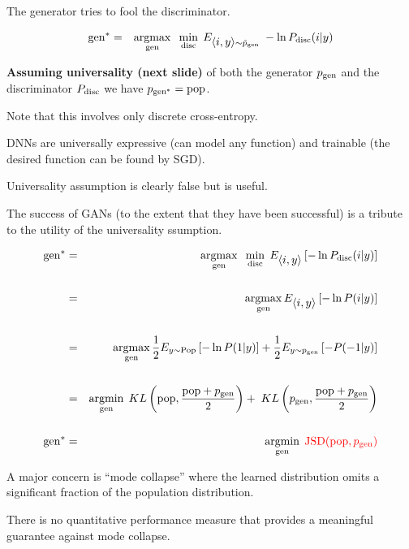 {

The generator tries to fool the discriminator.

\vfill
\begin{eqnarray*}
\mathrm{gen}^* & = & \operatorname*{argmax}_{\mathrm{gen}}\;\;\min_{\mathrm{disc}}\;E_{{\mbox{$\langle i,y\rangle$}} \sim \tilde{p}_{\mathrm{gen}}}\;-\ln P_{\mathrm{disc}}(i|y)
\end{eqnarray*}

\vfill
{\bf Assuming universality (next slide)} of both the generator $p_{\mathrm{gen}}$ and the discriminator $P_{\mathrm{disc}}$ we have {\color{red} $p_{\mathrm{gen}^*} = \mathrm{pop}$}.

\vfill
Note that this involves only discrete cross-entropy.



DNNs are universally expressive (can model any function) and trainable (the desired function can be found by SGD).

\vfill
Universality assumption is clearly false but is useful.

\vfill
The success of GANs (to the extent that they have been successful) is a tribute to the utility of the universality ssumption.



{\huge
\begin{eqnarray*}
  \mathrm{gen}^* & = & \operatorname*{argmax}_{\mathrm{gen}}\;\;\min_{\mathrm{disc}}\;E_{{\mbox{$\langle i,y\rangle$}}}\left[-\ln P_{\mathrm{disc}}(i|y)\right] \\
  \\
  & = & \operatorname*{argmax}_{\mathrm{gen}} E_{{\mbox{$\langle i,y\rangle$}}}\left[-\ln P(i|y)\right] \\
  \\
    & = & \operatorname*{argmax}_{\mathrm{gen}} \frac{1}{2}E_{y \sim \mathrm{Pop}}\left[-\ln P(1|y)\right] + \frac{1}{2} E_{y \sim p_{\mathrm{gen}}}\left[-P(-1|y)\right] \\
  \\
  & = & \operatorname*{argmin}_{\mathrm{gen}} \; KL\left(\mathrm{pop},\frac{\mathrm{pop}+p_{\mathrm{gen}}}{2}\right)+\;KL\left(p_{\mathrm{gen}},\frac{\mathrm{pop}+p_{\mathrm{gen}}}{2}\right) \\
  \\
  \mathrm{gen}^* & = & \operatorname*{argmin}_{\mathrm{gen}} \; {\color{red} \mathrm{JSD}(\mathrm{pop},p_{\mathrm{gen}})}
\end{eqnarray*}
}



A major concern is ``mode collapse'' where the learned distribution omits a significant fraction of the population distribution.

\vfill
There is no quantitative performance measure that provides a meaningful guarantee against mode collapse.

}

